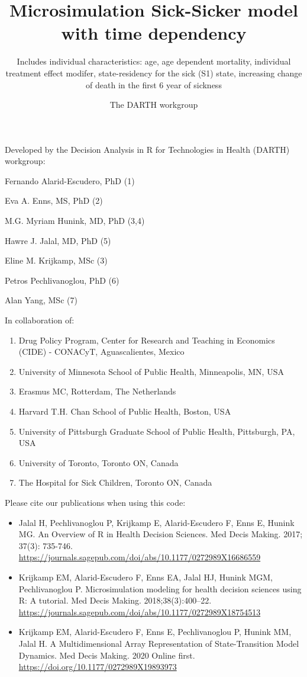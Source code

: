 \documentclass[
]{article}
\title{Microsimulation Sick-Sicker model with time dependency}
\subtitle{Includes individual characteristics: age, age dependent mortality,
individual treatment effect modifer, state-residency for the sick (S1)
state, increasing change of death in the first 6 year of sickness}
\author{The DARTH workgroup}
\date{}
\providecommand{\tightlist}{%
  \setlength{\itemsep}{0pt}\setlength{\parskip}{0pt}}
\begin{document}
\maketitle

Developed by the Decision Analysis in R for Technologies in Health
(DARTH) workgroup:

Fernando Alarid-Escudero, PhD (1)

Eva A. Enns, MS, PhD (2)

M.G. Myriam Hunink, MD, PhD (3,4)

Hawre J. Jalal, MD, PhD (5)

Eline M. Krijkamp, MSc (3)

Petros Pechlivanoglou, PhD (6)

Alan Yang, MSc (7)

In collaboration of:

\begin{enumerate}
\def\labelenumi{\arabic{enumi}.}
\tightlist
\item
  Drug Policy Program, Center for Research and Teaching in Economics
  (CIDE) - CONACyT, Aguascalientes, Mexico
\item
  University of Minnesota School of Public Health, Minneapolis, MN, USA
\item
  Erasmus MC, Rotterdam, The Netherlands
\item
  Harvard T.H. Chan School of Public Health, Boston, USA
\item
  University of Pittsburgh Graduate School of Public Health, Pittsburgh,
  PA, USA
\item
  University of Toronto, Toronto ON, Canada
\item
  The Hospital for Sick Children, Toronto ON, Canada
\end{enumerate}

Please cite our publications when using this code:

\begin{itemize}
\item
  Jalal H, Pechlivanoglou P, Krijkamp E, Alarid-Escudero F, Enns E,
  Hunink MG. An Overview of R in Health Decision Sciences. Med Decis
  Making. 2017; 37(3): 735-746.
  \url{https://journals.sagepub.com/doi/abs/10.1177/0272989X16686559}
\item
  Krijkamp EM, Alarid-Escudero F, Enns EA, Jalal HJ, Hunink MGM,
  Pechlivanoglou P. Microsimulation modeling for health decision
  sciences using R: A tutorial. Med Decis Making. 2018;38(3):400--22.
  \url{https://journals.sagepub.com/doi/abs/10.1177/0272989X18754513}
\item
  Krijkamp EM, Alarid-Escudero F, Enns E, Pechlivanoglou P, Hunink MM,
  Jalal H. A Multidimensional Array Representation of State-Transition
  Model Dynamics. Med Decis Making. 2020 Online first.
  \url{https://doi.org/10.1177/0272989X19893973}
\end{itemize}
\end{document}
